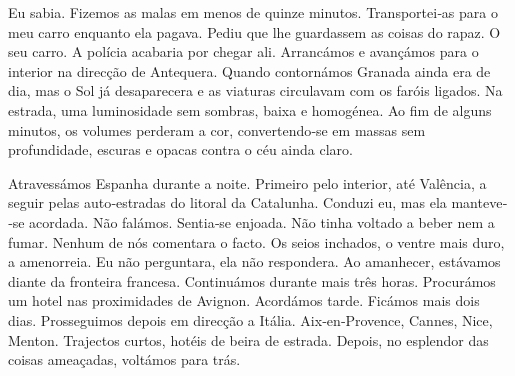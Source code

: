 Eu sabia. Fizemos as malas em menos de quinze minutos. Transportei­‑as
para o meu carro enquanto ela pagava. Pediu que lhe guardassem as coisas
do rapaz. O seu carro. A polícia acabaria por chegar ali. Arrancámos e
avançámos para o interior na direcção de Antequera. Quando contornámos
Granada ainda era de dia, mas o Sol já desaparecera e as viaturas
circulavam com os faróis ligados. Na estrada, uma luminosidade sem
sombras, baixa e homogénea. Ao fim de alguns minutos, os volumes
perderam a cor, convertendo­‑se em massas sem profundidade, escuras e
opacas contra o céu ainda claro.

Atravessámos Espanha durante a noite. Primeiro pelo interior, até
Valência, a seguir pelas auto­‑estradas do litoral da Catalunha. Conduzi
eu, mas ela manteve­‑se acordada. Não falámos. Sentia­‑se enjoada. Não
tinha voltado a beber nem a fumar. Nenhum de nós comentara o facto. Os
seios inchados, o ventre mais duro, a amenorreia. Eu não perguntara, ela
não respondera. Ao amanhecer, estávamos diante da fronteira francesa.
Continuámos durante mais três horas. Procurámos um hotel nas
proximidades de Avignon. Acordámos tarde. Ficámos mais dois dias.
Prosseguimos depois em direcção a Itália. Aix­‑en­‑Provence, Cannes,
Nice, Menton. Trajectos curtos, hotéis de beira de estrada. Depois, no
esplendor das coisas ameaçadas, voltámos para trás.

